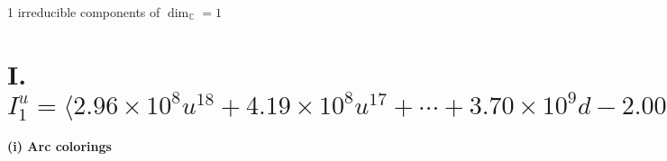 \documentclass[1p]{elsarticle_modified}
\theoremstyle{definition}
\begin{document}
\raggedright * 1 irreducible components of $\dim_{\mathbb{C}}=1$ \\
\newpage
\renewcommand{\arraystretch}{1}
\centering \section*{I. $I^u_{1}= \langle 2.96\times10^{8} u^{18}+4.19\times10^{8} u^{17}+\cdots+3.70\times10^{9} d-2.00\times10^{9},\;1.86\times10^{8} u^{18}+2.95\times10^{8} u^{17}+\cdots+3.70\times10^{9} c-4.96\times10^{9},\;-3.41\times10^{8} u^{18}-4.61\times10^{8} u^{17}+\cdots+3.70\times10^{9} b+2.24\times10^{9},\;-1.10\times10^{9} u^{18}-1.38\times10^{9} u^{17}+\cdots+7.40\times10^{9} a+9.00\times10^{9},\;u^{19}+2 u^{18}+\cdots+4 u^2-8 \rangle$}
\flushleft \textbf{(i) Arc colorings}\\
\end{document}
